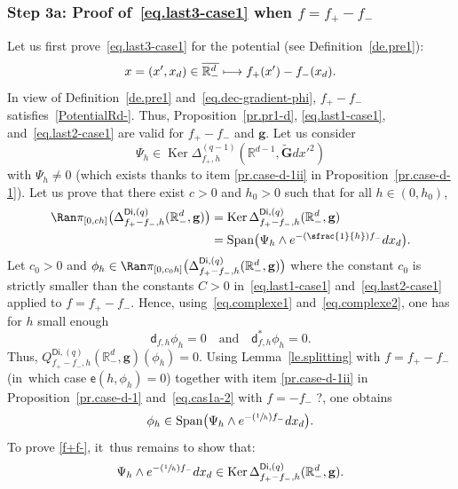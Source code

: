 \documentclass[10pt]{amsart}
\newcommand{\Psfrac}[2]{(\sfrac{#1}{#2})}
\newcommand\mto{\mathchoice{\longmapsto}{\mapsto}{\mapsto}{\mapsto}}
\newcommand{\quand}{\quad\text{and}\quad}
\DeclareMathOperator{\Span}{Span}
\newcommand{\mbf}[1]{\mathbf{#1}}
\DeclareMathOperator\Ker{Ker}
\theoremstyle{plain}
\theoremstyle{definition}
\begin{document}
\subsubsection*{Step 3a: Proof of~\eqref{eq.last3-case1} when $f=f_+-f_-$}
Let us first prove~\eqref{eq.last3-case1} for the potential (see Definition~\ref{de.pre1}):
\[
x=(x',x_d)\in \overline{\mathbb R^d_-}\mto f_+(x') -f_-(x_d).
\]
In view of Definition~\ref{de.pre1} and~\eqref{eq.dec-gradient-phi}, $f_+ -f_-$ satisfies~\ref{PotentialRd-}. Thus,
Proposition~\ref{pr.pr1-d}, \eqref{eq.last1-case1},
and~\eqref{eq.last2-case1} are valid for $f_+ -f_-$ and $ \mbf
g$. Let us consider
\[
\Psi_h \in \Ker \Delta_{f_+,h}^{(q-1)}(\mathbb
R^{d-1}, \tilde{\mbf G}dx'^2)
\]
with
$\Psi_h\neq 0$ (which exists thanks to item \eqref{pr.case-d-1ii} in Proposition~\ref{pr.case-d-1}).
Let us prove that there exist $c>0$ and $h_0>0$ such that for all
$h\in (0,h_0)$,
\begin{equation}\label{f+f-}
\begin{aligned}
\Ran \pi_{[0,ch]}\bigl(\Delta_{f_+ -f_-,h}^{\mathsf{Di},(q)}(\mathbb R_-^d, { \mbf g})\bigr)&=\Ker \Delta_{f_+
-f_-,h}^{\mathsf{Di},(q)}(\mathbb R_-^d, { \mbf g})\\
& =\Span \bigl(\Psi_h \wedge e^{-\Psfrac 1h f_- }dx_d\bigr).
\end{aligned}
\end{equation}
Let $c_0>0$ and $\phi_h\in \Ran \pi_{[0,c_0h]}\bigl(\Delta_{f_+-f_-,h}^{\mathsf{Di},(q)}(\mathbb R_-^d, \mbf g)
\bigr)$ where the constant $c_0$ is strictly smaller than the
constants $C>0$ in~\eqref{eq.last1-case1} and~\eqref{eq.last2-case1}
applied to $f=f_+ -f_-$. Hence, using~\eqref{eq.complexe1} and~\eqref{eq.complexe2}, one has for $h$ small enough
\[
\mathsf d_{f,h}\phi_h= 0 \quand \mathsf d_{f,h}^*\phi_h=0.
\]
Thus, $Q_{f_+-f_-,h}^{\mathsf{Di},(q)}(\mathbb R_-^d, \mbf g)(\phi_h)=0$. Using Lemma~\ref{le.splitting} with $f=f_+-f_-$ (in~which
case $\mathsf e(h,\phi_h)=0$) together with item \eqref{pr.case-d-1ii} in
Proposition~\ref{pr.case-d-1} and~\eqref{eq.cas1a-2} with $f=-f_-$ ?, one obtains
\begin{equation}\label{eq.imply-Phi}
\phi_h\in \Span \bigl(\Psi_h \wedge e^{-\Psfrac 1h f_- }dx_d\bigr).
\end{equation}
To prove \eqref{f+f-}, it~thus remains to show that:
\begin{equation}\label{=psi-1}
\Psi_h \wedge e^{-\Psfrac 1h f_- }dx_d\in \Ker \Delta_{f_+ -f_-,h}^{\mathsf{Di},(q)}(\mathbb R_-^d, { \mbf g}).
\end{equation}
\end{document}
